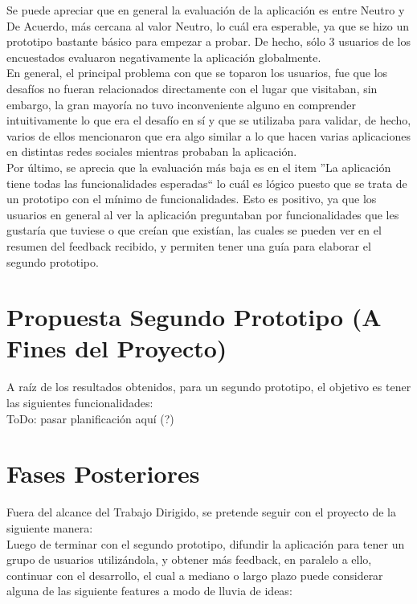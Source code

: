 \documentclass[10pt,letterpaper]{article}
\begin{document}
Se puede apreciar que en general la evaluación de la aplicación es entre Neutro y De Acuerdo, más cercana al valor Neutro, lo cuál era esperable, ya que se hizo un prototipo bastante básico para empezar a probar. De hecho, sólo 3 usuarios de los encuestados evaluaron negativamente la aplicación globalmente.\\

En general, el principal problema con que se toparon los usuarios, fue que los desafíos no fueran relacionados directamente con el lugar que visitaban, sin embargo, la gran mayoría no tuvo inconveniente alguno en comprender intuitivamente lo que era el desafío en sí y que se utilizaba para validar, de hecho, varios de ellos mencionaron que era algo similar a lo que hacen varias aplicaciones en distintas redes sociales mientras probaban la aplicación.\\

Por último, se aprecia que la evaluación más baja es en el item ''La aplicación tiene todas las funcionalidades esperadas`` lo cuál es lógico puesto que se trata de un prototipo con el mínimo de funcionalidades. Esto es positivo, ya que los usuarios en general al ver la aplicación preguntaban por funcionalidades que les gustaría que tuviese o que creían que existían, las cuales se pueden ver en el resumen del feedback recibido, y permiten tener una guía para elaborar el segundo prototipo.\\

\newpage
\section{Propuesta Segundo Prototipo (A Fines del Proyecto)}

A raíz de los resultados obtenidos, para un segundo prototipo, el objetivo es tener las siguientes funcionalidades:\\

ToDo: pasar planificación aquí (?)

\newpage
\section{Fases Posteriores}

Fuera del alcance del Trabajo Dirigido, se pretende seguir con el proyecto de la siguiente manera:\\

Luego de terminar con el segundo prototipo, difundir la aplicación para tener un grupo de usuarios utilizándola, y obtener más feedback, en paralelo a ello, continuar con el desarrollo, el cual a mediano o largo plazo puede considerar alguna de las siguiente features a modo de lluvia de ideas:\\
\end{document}
